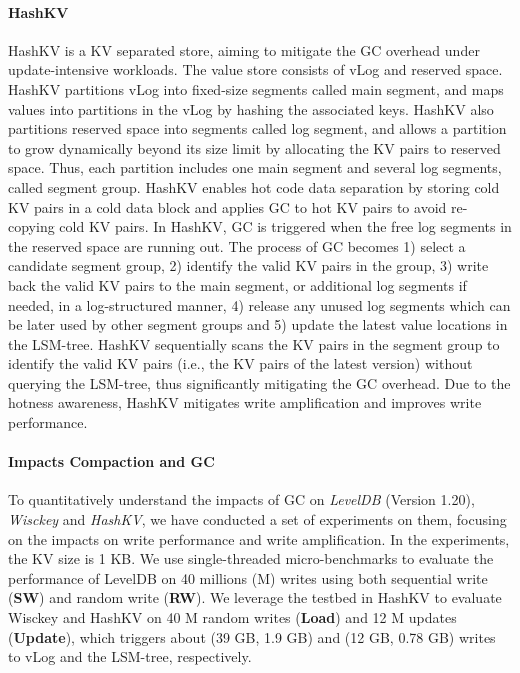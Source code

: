 \documentclass[sigconf]{acmart}
\begin{document}
\paragraph{HashKV} HashKV \cite{HashKV} is a KV separated store, aiming to mitigate the GC overhead under update-intensive workloads. The value store consists of vLog and reserved space. HashKV partitions vLog into fixed-size segments called main segment, and maps values into partitions in the vLog by hashing the associated keys. HashKV also partitions reserved space into segments called log segment, and allows a partition to grow dynamically beyond its size limit by allocating the KV pairs to reserved space. Thus, each partition includes one main segment and several log segments, called segment group. HashKV enables hot code data separation by storing cold KV pairs in a cold data block and applies GC to hot KV pairs to avoid re-copying cold KV pairs. In HashKV, GC is triggered when the free log segments in the reserved space are running out. The process of GC becomes 1) select a candidate segment group, 2) identify the valid KV pairs in the group, 3) write back the valid KV pairs to the main segment, or additional log segments if needed, in a log-structured manner, 4) release any unused log segments which can be later used by other segment groups and 5) update the latest value locations in the LSM-tree. HashKV sequentially scans the KV pairs in the segment group to identify the valid KV pairs (i.e., the KV pairs of the latest version) without querying the LSM-tree, thus significantly mitigating the GC overhead. Due to the  hotness awareness, HashKV mitigates write amplification and improves write performance.

\paragraph{Impacts Compaction and GC} To quantitatively understand the impacts of GC on {\it{LevelDB}} (Version 1.20), {\it{Wisckey}} and {\it{HashKV}}, we have conducted a set of experiments on them, focusing on the impacts on write performance and write amplification. In the experiments, the KV size is 1 KB. We use single-threaded micro-benchmarks to evaluate the performance of LevelDB on 40 millions (M) writes using both sequential write (\textbf{SW}) and random write (\textbf{RW}). We leverage the testbed in HashKV \cite{HashKV} to evaluate Wisckey and HashKV on 40 M random writes (\textbf{Load}) and 12 M updates (\textbf{Update}), which triggers about (39 GB, 1.9 GB) and (12 GB, 0.78 GB) writes to vLog and the LSM-tree, respectively. 
\end{document}
